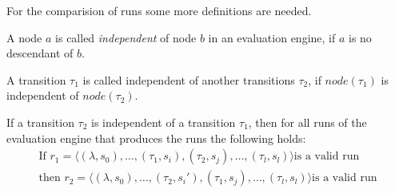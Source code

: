 For the comparision of runs some more definitions are needed.

\begin{definition}[name = Independence of Nodes]\label{def:node_independent}
  A node \(a\) is called \emph{independent} of node \(b\) in an evaluation engine, if \(a\) is no descendant of \(b\).
\end{definition}

\begin{definition}[name = Independence of Transitions]\label{def:independence_transitions}
  A transition \(\tau_1\) is called independent of another transitions \(\tau_2\), if \(\mathit{node}(\tau_1)\) is independent of \(\mathit{node}(\tau_2)\).
\end{definition}

\begin{lemma}[name = Exchange of Independent Transitions]\label{lemma:exchange_independent_transitions}
  If a transition \(\tau_2\) is independent of a transition \(\tau_1\), then for all runs of the evaluation engine that produces the runs the following holds:
  \begin{align*}
    \text{If } r_1 = \langle (\lambda, s_0), \dots, (\tau_1, s_i), (\tau_2, s_j), \dots, (\tau_l, s_l) \rangle \text{is a valid run} \\
    \text{then } r_2 = \langle (\lambda, s_0), \dots, (\tau_2, s_i'), (\tau_1, s_j), \dots, (\tau_l, s_l) \rangle \text{is a valid run}
  \end{align*}
\end{lemma}


